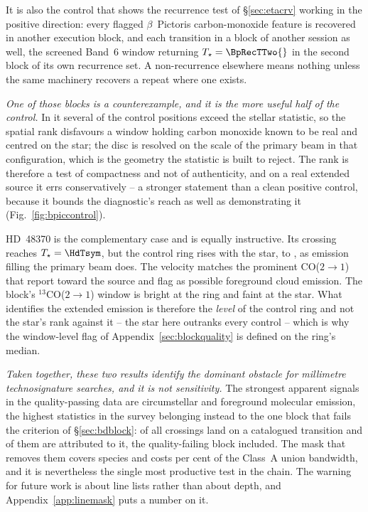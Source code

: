 It is also the control that shows the recurrence test of
\S\ref{sec:etacrv} working in the positive direction: every flagged
$\beta$~Pictoris carbon-monoxide feature is recovered in another execution
block, and each transition in a block of another session as well, the
screened Band~6 window returning
$T_\star=\BpRecTTwo{}$ in the second block of its own recurrence set. A
non-recurrence elsewhere means nothing unless the same machinery recovers a
repeat where one exists.

\emph{One of those blocks is a counterexample, and it is the more useful half
of the control.} In it several of the \NCtrl{} control positions exceed the
stellar statistic, so the spatial rank disfavours a window holding carbon
monoxide known to be real and centred on the star; the disc is resolved on
the scale of the primary beam in that configuration, which is the geometry
the statistic is built to reject. The rank is therefore a test of
compactness and not of authenticity, and on a real extended source it errs
conservatively -- a stronger statement than a clean positive control, because
it bounds the diagnostic's reach as well as demonstrating it
(Fig.~\ref{fig:bpiccontrol}).



HD~48370 is the complementary case and is equally instructive. Its crossing
reaches $T_\star=\HdTsym$, but the control ring rises with the star, to
\HdRingMax, as emission filling the primary beam does. The velocity matches
the prominent CO($2{\to}1$) that \citet{Cataldi2023} report toward the
source and flag as possible foreground cloud emission. The block's
$^{13}$CO($2{\to}1$) window is bright at the ring and faint at the star.
What identifies the extended emission is therefore the \emph{level} of the
control ring and not the star's rank against it -- the star here outranks
every control -- which is why the window-level flag of
Appendix~\ref{sec:blockquality} is defined on the ring's median.

\emph{Taken together, these two results identify the dominant obstacle for
millimetre technosignature searches, and it is not sensitivity.} The
strongest apparent signals in the quality-passing data are circumstellar and
foreground molecular emission, the \DqBlockNCross{} highest statistics in the
survey belonging instead to the one block that fails the criterion of
\S\ref{sec:bdblock}: \MkNCoinc{} of all \NCross{} crossings land
on a catalogued transition and \NAttributed{} of them are attributed to it,
the quality-failing block included. The mask that
removes them covers \FrNSpec{} species and costs \MkMaskAPct{} per cent of
the Class~A union bandwidth, and it is nevertheless the single most
productive test in the chain. The warning for
future work is about line lists rather than about depth, and
Appendix~\ref{app:linemask} puts a number on it.

